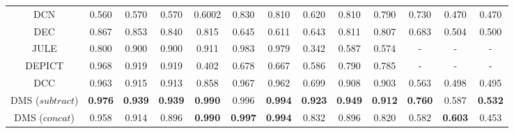 \begin{tabular}{|c|ccc|ccc|ccc|ccc|}
DCN	&	0.560	&	0.570	&	0.570	&	0.6002	&	0.830	&	0.810	&	0.620	&	0.810	&	0.790	&	0.730	&	0.470	&	0.470	\\																					
DEC	&	0.867	&	0.853	&	0.840	&	0.815	&	0.645	&	0.611	&	0.643	&	0.811	&	0.807	&	0.683	&	0.504	&	0.500	\\																					
JULE	&	0.800	&	0.900	&	0.900	&	0.911	& 0.983	&	0.979	&	0.342	&	0.587	&	0.574	&	-	&	-	&	-	\\																					
DEPICT	& 0.968	&	0.919	&	0.919	&	0.402	&	0.678	&	0.667	&	0.586	&	0.790	&	0.785	&	-	&	-	&	-	\\																					
DCC	&	0.963	&	0.915	&	0.913	&	0.858	&	0.967	&	0.962	&	0.699	&	0.908	& 0.903	&	0.563	& 0.498 &	0.495	\\																					
\hline \hline	

\addlinespace[0.1em]


DMS ($subtract$)
& \textbf{	0.976}	&	\textbf{0.939}	&	\textbf{0.939}	&	\textbf{0.990}	&0.996	&	\textbf{0.994}	& \textbf{0.923}	&\textbf{	0.949}	&	\textbf{0.912}	&	\textbf{0.760}	&	0.587	&	\textbf{0.532}	\\		

DMS ($concat$)
& 0.958		& 0.914		& 0.896		&	\textbf{0.990}	&	\textbf{0.997}	&\textbf{	0.994}	& 0.832		&	0.896	& 0.820		& 0.582	& \textbf{0.603}	&	0.453	\\		


\hline																																				
\end{tabular}	

